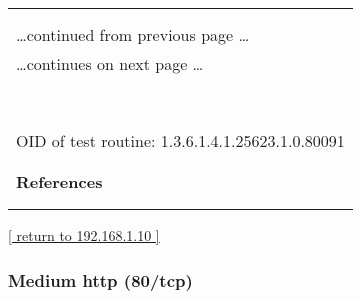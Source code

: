 \documentclass{article}
\begin{document}
\begin{longtable}{|p{}|}
\hline
\rowcolor{openvas_warning}{\color{white}{Medium (CVSS: 2.6) }}\\
\rowcolor{openvas_warning}{\color{white}{NVT: TCP timestamps}}\\
\hline
\endfirsthead
\hfill\ldots continued from previous page \ldots \\
\hline
\endhead
\hline
\ldots continues on next page \ldots \\
\endfoot
\hline
\endlastfoot
\\
\rowcolor{white}{\verb=It was detected that the host implements RFC1323.=}\\
\rowcolor{white}{\verb=The following timestamps were retrieved with a delay of 1 seconds in-between:=}\\
\rowcolor{white}{\verb=Paket 1: 720558107=}\\
\rowcolor{white}{\verb=Paket 2: 720558210=}\\
\rowcolor{white}{\verb==}\\
\rowcolor{white}{\verb==}\\
\\
OID of test routine: 1.3.6.1.4.1.25623.1.0.80091\\
\\

      \hline
      \\
\textbf{References}\\
\rowcolor{white}{\verb=Other:=}\\
\rowcolor{white}{\verb=  URL:http://www.ietf.org/rfc/rfc1323.txt=}\\
\end{longtable}

\begin{footnotesize}\hyperref[host:192.168.1.10]{[ return to 192.168.1.10 ]}\end{footnotesize}
\subsubsection{Medium http (80/tcp)}
\label{port:192.168.1.10 http (80/tcp) Medium}
\end{document}
